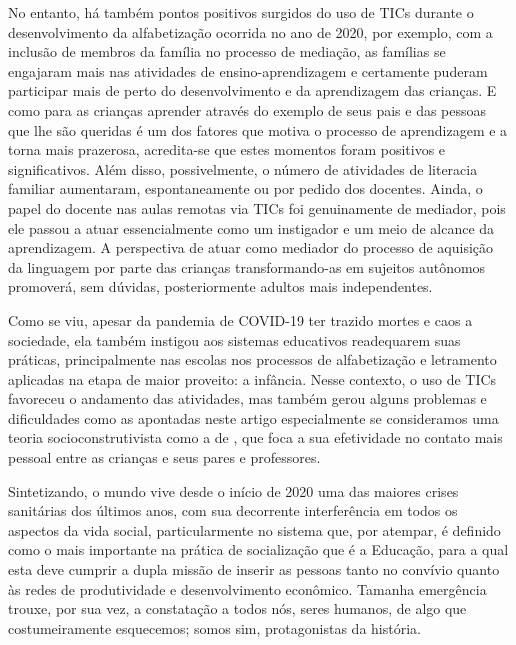 \documentclass{textolivre}
\begin{document}
No entanto, há também pontos positivos surgidos do uso de TICs durante o desenvolvimento da alfabetização ocorrida no ano de 2020, por exemplo, com a inclusão de membros da família no processo de mediação, as famílias se engajaram mais nas atividades de ensino-aprendizagem e certamente puderam participar mais de perto do desenvolvimento e da aprendizagem das crianças. E como para as crianças aprender através do exemplo de seus pais e das pessoas que lhe são queridas é um dos fatores que motiva o processo de aprendizagem e a torna mais prazerosa, acredita-se que estes momentos foram positivos e significativos. Além disso, possivelmente, o número de atividades de literacia familiar aumentaram, espontaneamente ou por pedido dos docentes. Ainda, o papel do docente nas aulas remotas via TICs foi genuinamente de mediador, pois ele passou a atuar essencialmente como um instigador e um meio de alcance da aprendizagem. A perspectiva de atuar como mediador do processo de aquisição da linguagem por parte das crianças transformando-as em sujeitos autônomos promoverá, sem dúvidas, posteriormente adultos mais independentes.

Como se viu, apesar da pandemia de COVID-19 ter trazido mortes e caos a sociedade, ela também instigou aos sistemas educativos readequarem suas práticas, principalmente nas escolas nos processos de alfabetização e letramento aplicadas na etapa de maior proveito: a infância. Nesse contexto, o uso de TICs favoreceu o andamento das atividades, mas também gerou alguns problemas e dificuldades como as apontadas neste artigo especialmente se consideramos uma teoria socioconstrutivista como a de \textcite{vygotski1991}, que foca a sua efetividade no contato mais pessoal entre as crianças e seus pares e professores.

Sintetizando, o mundo vive desde o início de 2020 uma das maiores crises sanitárias dos últimos anos, com sua decorrente interferência em todos os aspectos da vida social, particularmente no sistema que, por atempar, é definido como o mais importante na prática de socialização que é a Educação, para a qual esta deve cumprir a dupla missão de inserir as pessoas tanto no convívio quanto às redes de produtividade e desenvolvimento econômico. Tamanha emergência trouxe, por sua vez, a constatação a todos nós, seres humanos, de algo que costumeiramente esquecemos; somos sim, protagonistas da história.




\printbibliography\label{sec-bib}
\end{document}
